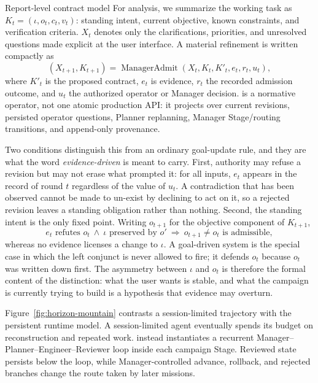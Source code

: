 \begin{paperbox}{Report-level contract model}
For analysis, we summarize the working task as
$K_t=(\iota,o_t,c_t,v_t)$: standing intent, current objective, known constraints,
and verification criteria. $X_t$ denotes only the clarifications, priorities, and
unresolved questions made explicit at the user interface. A material refinement is
written compactly as
\[
  (X_{t+1},K_{t+1})
  =\operatorname{ManagerAdmit}(X_t,K_t,K'_t,e_t,r_t,u_t),
\]
where $K'_t$ is the proposed contract, $e_t$ is evidence, $r_t$ the recorded
admission outcome, and $u_t$ the authorized operator or Manager
decision.  is a normative operator, not one atomic production
API: it projects over current  revisions, persisted operator
questions, Planner replanning, Manager Stage/routing transitions, and append-only
provenance.

Two conditions distinguish this from an ordinary goal-update rule, and they are what
the word \emph{evidence-driven} is meant to carry. First, authority may refuse a
revision but may not erase what prompted it: for all inputs, $e_t$ appears in the
record of round $t$ regardless of the value of $u_t$. A contradiction that has been
observed cannot be made to un-exist by declining to act on it, so a rejected
revision leaves a standing obligation rather than nothing. Second, the standing
intent is the only fixed point. Writing $o_{t+1}$ for the objective component of
$K_{t+1}$,
\[
  e_t \text{ refutes } o_t \ \wedge\ \iota \text{ preserved by } o'
  \ \Longrightarrow\ o_{t+1}\neq o_t \text{ is admissible},
\]
whereas no evidence licenses a change to $\iota$. A goal-driven system is the
special case in which the left conjunct is never allowed to fire; it defends $o_t$
because $o_t$ was written down first. The asymmetry between $\iota$ and $o_t$ is
therefore the formal content of the distinction: what the user wants is stable, and
what the campaign is currently trying to build is a hypothesis that evidence may
overturn.
\end{paperbox}

Figure~\ref{fig:horizon-mountain} contrasts a session-limited trajectory with the
persistent runtime model. A session-limited agent eventually spends its budget on
reconstruction and repeated work. \systemname instead instantiates a recurrent
Manager--Planner--Engineer--Reviewer loop inside each campaign Stage. Reviewed
state persists below the loop, while Manager-controlled advance, rollback, and
rejected branches change the route taken by later missions.

